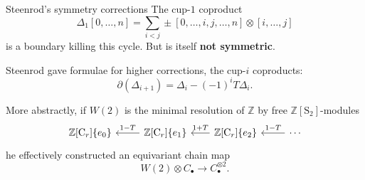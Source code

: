 \documentclass[10pt,t, handout]{beamer} %
\renewcommand{\S}{\mathrm{S}}
\newcommand{\C}{\mathrm{C}}
\begin{document}
\begin{frame}[fragile]{Steenrod's symmetry corrections}
	The cup-$1$ coproduct
	\begin{equation*}
	\Delta_1 [0, \dots, n] = \sum_{i<j} \pm [0, \dots, i, j, \dots, n] \otimes [i, \dots, j]
	\end{equation*}
	is a boundary killing this cycle. But is itself \textbf{not symmetric}.
	
	\vspace*{10pt} \pause
	
	Steenrod gave formulae for higher corrections, the cup-$i$ coproducts:
	\begin{equation*}
	\partial (\Delta_{i+1}) = \Delta_i - (-1)^i T \Delta_i.
	\end{equation*}
	
	\vspace*{0pt}\pause
	
	More abstractly, if $W(2)$ is the minimal resolution of $\mathbb Z$ by free $\mathbb Z[\S_2]$-modules
	\begin{equation*}
	\begin{tikzcd}[column sep=normal]
	\mathbb{Z}[\C_r]\{e_0\} & \arrow[l, "1-T"'] \mathbb{Z}[\C_r]\{e_1\} &[-5pt] \arrow[l, "1+T"']
	\mathbb{Z}[\C_r]\{e_2\} & \arrow[l, "1-T"'] \cdots
	\end{tikzcd}
	\end{equation*}
	\pause he effectively constructed an equivariant chain map
	\begin{equation*}
	W(2) \otimes C_\bullet \to C_\bullet^{\otimes 2}.
	\end{equation*}
\end{frame}
	
\end{document}
